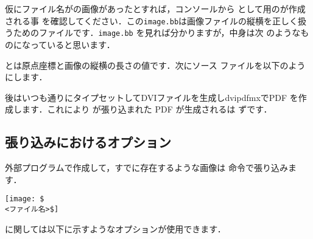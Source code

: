 \begin{Exe}
仮にファイル名がの画像があったとすれば，コンソールから
として用のが作成される事
を確認してください．この\texttt{image.bb}は画像ファイルの縦横を正しく扱
うためのファイルです．\texttt{image.bb} を見れば分かりますが，中身は次
のようなものになっていると思います．

\begin{intext}
\end{intext}

とは原点座標と画像の縦横の長さの値です．次にソース
ファイルを以下のようにします．


後はいつも通りにタイプセットしてDVIファイルを生成し{dvipdfmx}でPDF
を作成します．これにより が張り込まれた PDF が生成されるは
ずです．
\end{Exe}

\subsection{張り込みにおけるオプション}

外部プログラムで作成して，すでに存在するような画像は 
命令で張り込みます．
\begin{usage}
\texttt{[image: \$\\<ファイル名>\$]} 
\end{usage}

に関しては以下に示すようなオプションが使用できます．

